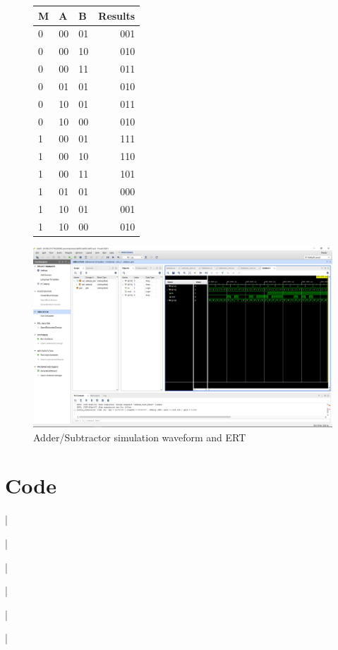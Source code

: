 \documentclass[11pt]{article}
\newcommand{\Verilog}[2][]{%
	
}
\begin{document}
\begin{figure}[ht]\centering
	\begin{tabular}{lll|r}
		M & A & B & Results \\
		\midrule
		0 & 00 & 01 & 001 \\
		0 & 00 & 10 & 010 \\
		0 & 00 & 11 & 011 \\ 
		0 & 01 & 01 & 010 \\
		0 & 10 & 01 & 011 \\
		0 & 10 & 00 & 010 \\
		1 & 00 & 01 & 111 \\
		1 & 00 & 10 & 110 \\
		1 & 00 & 11 & 101 \\
		1 & 01 & 01 & 000 \\
		1 & 10 & 01 & 001 \\
		1 & 10 & 00 & 010 \\
		\bottomrule
	\end{tabular}\medskip
	
	\includegraphics[width=1\textwidth,trim=19cm 15cm 0.5cm 4.5cm,clip]{lab05_addsub_screenshot}
	\caption{Adder/Subtractor simulation waveform and ERT}
	\label{fig:sim_with_table}
\end{figure}


\section*{Code}

\Verilog[firstline=22, lastline=56, caption=Half Adder Verilog code]{Lab05/codedirectory/halfadder.sv}|

\Verilog[firstline=22, lastline=46, caption=Half Adder Test Bench Verilog code]{Lab05/codedirectory/halfadder_test.sv}|

\Verilog[firstline=22, lastline=50, caption=Full Adder Verilog code]{Lab05/codedirectory/fulladder.sv}|

\Verilog[firstline=22, lastline=51, caption=Full Adder Test Bench Verilog code]{Lab05/codedirectory/fulladder_test.sv}|

\Verilog[firstline=22, lastline=56, caption=Adder/Subtractor Verilog code]{Lab05/codedirectory/addsub.sv}|

\Verilog[firstline=22, lastline=76, caption=Adder/Subtractor Test Bench Verilog code]{Lab05/codedirectory/addsub_test.sv}|
\end{document}
